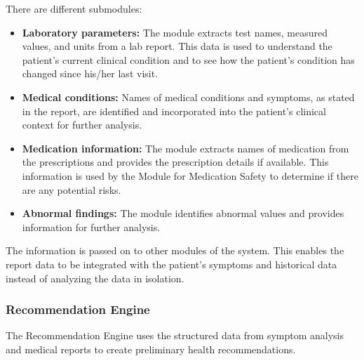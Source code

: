 \documentclass[conference]{IEEEtran}
\begin{document}
There are different submodules:

\begin{itemize}

\item \textbf{Laboratory parameters:} The module extracts test names, measured values, and units from a lab report. This data is used to understand the patient’s current clinical condition and to see how the patient’s condition has changed since his/her last visit.

\item \textbf{Medical conditions:} Names of medical conditions and symptoms, as stated in the report, are identified and incorporated into the patient’s clinical context for further analysis.

\item \textbf{Medication information:} The module extracts names of medication from the prescriptions and provides the prescription details if available. This information is used by the Module for Medication Safety to determine if there are any potential risks.

\item \textbf{Abnormal findings:} The module identifies abnormal values and provides information for further analysis.
\end{itemize}

The information is passed on to other modules of the system. This enables the report data to be integrated with the patient’s symptoms and historical data instead of analyzing the data in isolation.

\subsubsection{Recommendation Engine}

The Recommendation Engine uses the structured data from symptom analysis and medical reports to create preliminary health recommendations.
\end{document}
